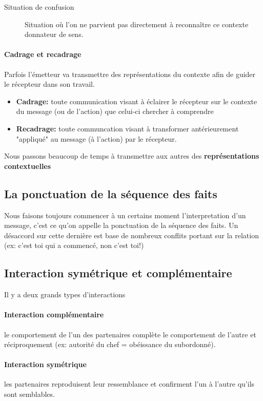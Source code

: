 \documentclass[11pt]{article} %
\begin{document}
	\begin{description}
		\item[Situation de confusion] Situation où l'on ne parvient pas directement à reconnaître ce contexte donnateur de sens.
	\end{description}

	\paragraph{Cadrage et recadrage} Parfois l'émetteur va transmettre des représentations du contexte afin de guider le récepteur dans son travail.
	\begin{itemize}
		\item \textbf{Cadrage:} toute communication visant à éclairer le récepteur sur le contexte du message (ou de l'action) que celui-ci chercher à comprendre
		\item \textbf{Recadrage:} toute communcation visant à transformer  antérieurement "appliqué" au message (à l'action) par le récepteur. 
	\end{itemize}
	
	Nous passons beaucoup de temps à transmettre aux autres des \textbf{représentations contextuelles}

	\subsection{La ponctuation de la séquence des faits}

		Nous faisons toujours commencer à un certains moment l'interpretation d'un message, c'est ce qu'on appelle la ponctuation de la séquence des faits. Un désaccord sur cette dernière est base de nombreux conflits portant sur la relation (ex: c'est toi qui a commencé, non c'est toi!)

	\subsection{Interaction symétrique et complémentaire}

	Il y a deux grands types d'interactions
	\paragraph{Interaction complémentaire} le comportement de l'un des partenaires complète le comportement de l'autre et réciproquement (ex: autorité du chef = obéissance du subordonné).

	\paragraph{Interaction symétrique} les partenaires reproduisent leur ressemblance et confirment l'un à l'autre qu'ils sont semblables.
\end{document}
